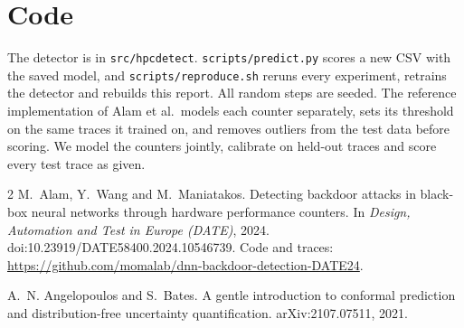 \documentclass[11pt,a4paper]{article}
\begin{document}
\section{Code}

The detector is in \texttt{src/hpcdetect}. \texttt{scripts/predict.py} scores a new CSV with the saved model, and
\texttt{scripts/reproduce.sh} reruns every experiment, retrains the detector and rebuilds this report. All random
steps are seeded. The reference implementation of Alam et al.\ models each counter separately, sets its threshold
on the same traces it trained on, and removes outliers from the test data before scoring. We model the counters
jointly, calibrate on held-out traces and score every test trace as given.

\begin{thebibliography}{2}\small
{}
M.~Alam, Y.~Wang and M.~Maniatakos.
\newblock Detecting backdoor attacks in black-box neural networks through hardware performance counters.
\newblock In \emph{Design, Automation and Test in Europe (DATE)}, 2024. doi:10.23919/DATE58400.2024.10546739.
Code and traces: \url{https://github.com/momalab/dnn-backdoor-detection-DATE24}.

A.~N. Angelopoulos and S.~Bates.
\newblock A gentle introduction to conformal prediction and distribution-free uncertainty quantification.
\newblock arXiv:2107.07511, 2021.
\end{thebibliography}
\end{document}
